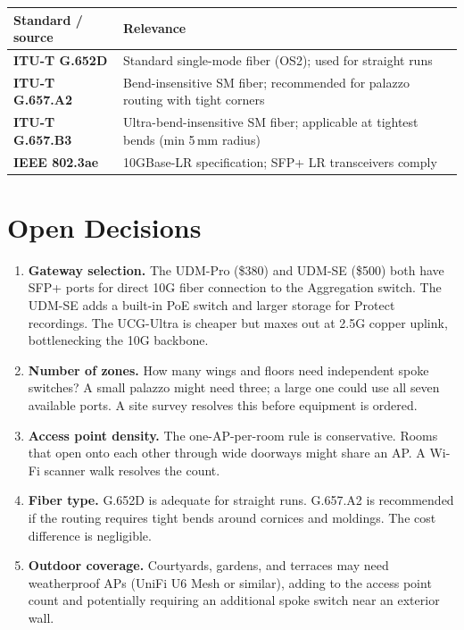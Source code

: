 \documentclass[]{anvil-proposal}
\begin{document}
\begin{tabularx}{\textwidth}{@{} >{\bfseries}l X @{}}
\toprule
\textbf{Standard / source} & \textbf{Relevance} \\
\midrule
ITU-T G.652D & Standard single-mode fiber (OS2); used for straight runs \\
ITU-T G.657.A2 & Bend-insensitive SM fiber; recommended for palazzo routing with tight corners \\
ITU-T G.657.B3 & Ultra-bend-insensitive SM fiber; applicable at tightest bends (min 5\,mm radius) \\
IEEE 802.3ae & 10GBase-LR specification; SFP+ LR transceivers comply \\
\bottomrule
\end{tabularx}

\section{Open Decisions}

\begin{enumerate}
  \item \textbf{Gateway selection.} The UDM-Pro (\$380) and UDM-SE (\$500) both have SFP+ ports for direct 10G fiber connection to the Aggregation switch. The UDM-SE adds a built-in PoE switch and larger storage for Protect recordings. The UCG-Ultra is cheaper but maxes out at 2.5G copper uplink, bottlenecking the 10G backbone.
  \item \textbf{Number of zones.} How many wings and floors need independent spoke switches? A small palazzo might need three; a large one could use all seven available ports. A site survey resolves this before equipment is ordered.
  \item \textbf{Access point density.} The one-AP-per-room rule is conservative. Rooms that open onto each other through wide doorways might share an AP. A Wi-Fi scanner walk resolves the count.
  \item \textbf{Fiber type.} G.652D is adequate for straight runs. G.657.A2 is recommended if the routing requires tight bends around cornices and moldings. The cost difference is negligible.
  \item \textbf{Outdoor coverage.} Courtyards, gardens, and terraces may need weatherproof APs (UniFi U6 Mesh or similar), adding to the access point count and potentially requiring an additional spoke switch near an exterior wall.
\end{enumerate}

\end{document}

